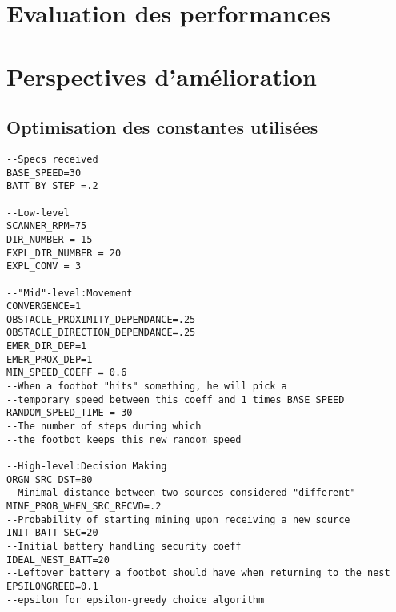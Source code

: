\section{Evaluation des performances}

\section{Perspectives d'amélioration}

\subsection{Optimisation des constantes utilisées}

\begin{lstlisting}[caption=Définitions des variables globales]
--Specs received
BASE_SPEED=30
BATT_BY_STEP =.2

--Low-level
SCANNER_RPM=75
DIR_NUMBER = 15
EXPL_DIR_NUMBER = 20
EXPL_CONV = 3

--"Mid"-level:Movement
CONVERGENCE=1
OBSTACLE_PROXIMITY_DEPENDANCE=.25
OBSTACLE_DIRECTION_DEPENDANCE=.25
EMER_DIR_DEP=1
EMER_PROX_DEP=1
MIN_SPEED_COEFF = 0.6
--When a footbot "hits" something, he will pick a
--temporary speed between this coeff and 1 times BASE_SPEED
RANDOM_SPEED_TIME = 30
--The number of steps during which
--the footbot keeps this new random speed

--High-level:Decision Making
ORGN_SRC_DST=80
--Minimal distance between two sources considered "different"
MINE_PROB_WHEN_SRC_RECVD=.2
--Probability of starting mining upon receiving a new source
INIT_BATT_SEC=20
--Initial battery handling security coeff
IDEAL_NEST_BATT=20
--Leftover battery a footbot should have when returning to the nest
EPSILONGREED=0.1
--epsilon for epsilon-greedy choice algorithm
\end{lstlisting}
